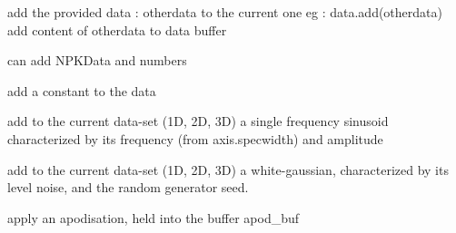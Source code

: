 \documentclass[letterpaper,10pt,openany,oneside]{sphinxmanual}
\begin{document}
\begin{fulllineitems}
\begin{fulllineitems}
\end{fulllineitems}


\begin{fulllineitems}
\label{rst/code:NPKData.NPKData.add}
add the provided data : otherdata to the current one
eg : data.add(otherdata) add content of otherdata to data buffer

can add NPKData and numbers

\end{fulllineitems}


\begin{fulllineitems}
\label{rst/code:NPKData.NPKData.addbase}
add a constant to the data

\end{fulllineitems}


\begin{fulllineitems}
\label{rst/code:NPKData.NPKData.addfreq}
add to the current data-set (1D, 2D, 3D) a single frequency sinusoid
characterized by its frequency (from axis.specwidth) and amplitude

\end{fulllineitems}


\begin{fulllineitems}
\label{rst/code:NPKData.NPKData.addnoise}
add to the current data-set (1D, 2D, 3D) a white-gaussian, 
characterized by its level noise, and the random generator seed.

\end{fulllineitems}


\begin{fulllineitems}
\label{rst/code:NPKData.NPKData.apod_apply}
apply an apodisation, held into the buffer apod\_buf

\end{fulllineitems}


\end{fulllineitems}
\end{document}
